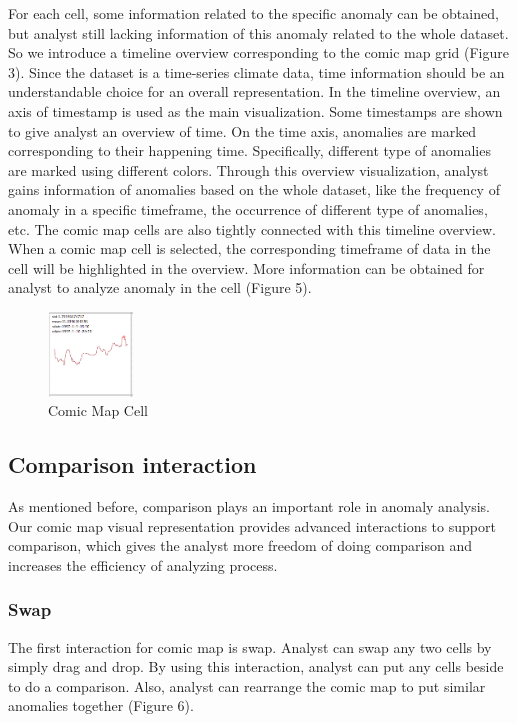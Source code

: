 \documentclass{vgtc}                          %
\begin{document}
For each cell, some information related to the specific anomaly can be obtained, but analyst still lacking information of this anomaly related to the whole dataset. So we introduce a timeline overview corresponding to the comic map grid (Figure 3). 
Since the dataset is a time-series climate data, time information should be an understandable choice for an overall representation. In the timeline overview, an axis of timestamp is used as the main visualization. Some timestamps are shown to give analyst an overview of time. On the time axis, anomalies are marked corresponding to their happening time. Specifically, different type of anomalies are marked using different colors. Through this overview visualization, analyst gains information of anomalies based on the whole dataset, like the frequency of anomaly in a specific timeframe, the occurrence of different type of anomalies, etc. 
The comic map cells are also tightly connected with this timeline overview. When a comic map cell is selected, the corresponding timeframe of data in the cell will be highlighted in the overview. More information can be obtained for analyst to analyze anomaly in the cell (Figure 5). 

 \begin{figure}[htb]
	\centering
  \includegraphics[width=0.20\textwidth]{onecell.jpg}
  \caption{Comic Map Cell}
\end{figure}

\subsection{Comparison interaction}
As mentioned before, comparison plays an important role in anomaly analysis. Our comic map visual representation provides advanced interactions to support comparison, which gives the analyst more freedom of doing comparison and increases the efficiency of analyzing process.

\subsubsection{Swap}
The first interaction for comic map is swap. Analyst can swap any two cells by simply drag and drop. By using this interaction, analyst can put any cells beside to do a comparison.  Also, analyst can rearrange the comic map to put similar anomalies together (Figure 6).  
\end{document}
